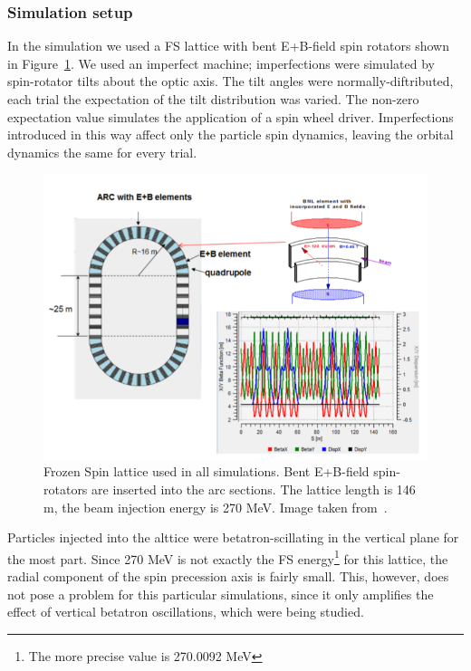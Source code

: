 \documentclass[]{elsarticle}
\begin{document}
\subsubsection{Simulation setup}\label{sec:betatron:simulation}
In the simulation we used a FS lattice with bent E+B-field spin rotators
shown in Figure~\ref{fig:BNL_lattice}.
We used an imperfect machine; imperfections were simulated by spin-rotator tilts about the optic axis.
The tilt angles were normally-diftributed, each trial the expectation of the tilt distribution was varied.
The non-zero expectation value simulates the application of a spin wheel driver.
Imperfections introduced in this way affect only the particle spin dynamics,
leaving the orbital dynamics the same for every trial.

\begin{figure}[h]
  \includegraphics[width=\linewidth]{img/BNL_lattice}
  \caption{Frozen Spin lattice used in all simulations. Bent E+B-field spin-rotators are inserted
    into the arc sections. The lattice length is 146 m,
    the beam injection energy is 270 MeV. Image taken from~\cite{Senichev:Lattices}.\label{fig:BNL_lattice}}
\end{figure}


Particles injected into the alttice were betatron-scillating in the vertical plane for the most part.
Since 270 MeV is not exactly the FS energy\footnote{The more precise value is 270.0092 MeV}
for this lattice, the radial component of the spin precession axis is fairly small. This, however,
does not pose a problem for this particular simulations, since it only amplifies the effect of vertical
betatron oscillations, which were being studied.
\end{document}
